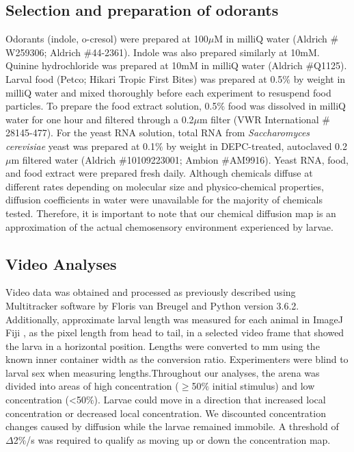 \subsection*{Selection and preparation of odorants}
\noindent Odorants (indole, o-cresol) were prepared at 100${\mu}$M in milliQ water (Aldrich ${\#}$W259306; Aldrich ${\#}$44-2361). Indole was also prepared similarly at 10mM. Quinine hydrochloride was prepared at 10mM in milliQ water (Aldrich ${\#}$Q1125). Larval food (Petco; Hikari Tropic First Bites) was prepared at 0.5${\%}$ by weight in milliQ water and mixed thoroughly before each experiment to resuspend food particles. To prepare the food extract solution, 0.5${\%}$ food was dissolved in milliQ water for one hour and filtered through a 0.2${\mu}$m filter (VWR International ${\#}$28145-477). For the yeast RNA solution, total RNA from \textit{Saccharomyces cerevisiae} yeast was prepared at 0.1${\%}$ by weight in DEPC-treated, autoclaved 0.2${\mu}$m filtered water (Aldrich ${\#}$10109223001; Ambion ${\#}$AM9916). Yeast RNA, food, and food extract were prepared fresh daily. Although chemicals diffuse at different rates depending on molecular size and physico-chemical properties, diffusion coefficients in water were unavailable for the majority of chemicals tested. Therefore, it is important to note that our chemical diffusion map is an approximation of the actual chemosensory environment experienced by larvae.

\subsection*{Video Analyses} 
\noindent Video data was obtained and processed as previously described \cite{Bui2018-iq} using Multitracker software by Floris van Breugel \cite{Van_Breugel2018-ii} and Python version 3.6.2. Additionally, approximate larval length was measured for each animal in ImageJ Fiji \cite{Schindelin2012-vw}, as the pixel length from head to tail, in a selected video frame that showed the larva in a horizontal position. Lengths were converted to mm using the known inner container width as the conversion ratio. Experimenters were blind to larval sex when measuring lengths.Throughout our analyses, the arena was divided into areas of high concentration (${\geq}$50${\%}$ initial stimulus) and low concentration (<50${\%}$). Larvae could move in a direction that increased local concentration or decreased local concentration. We discounted concentration changes caused by diffusion while the larvae remained immobile. A threshold of ${\Delta}$2${\%}$/s was required to qualify as moving up or down the concentration map.

